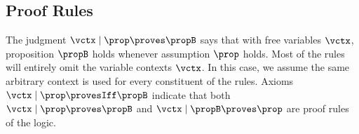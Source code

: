 
\subsection{Proof Rules}
\label{sec:proof-rules}

The judgment $\vctx \mid \prop \proves \propB$ says that with free variables $\vctx$, proposition $\propB$ holds whenever assumption $\prop$ holds.
Most of the rules will entirely omit the variable contexts $\vctx$.
In this case, we assume the same arbitrary context is used for every constituent of the rules.
Axioms $\vctx \mid \prop \provesIff \propB$ indicate that both $\vctx \mid \prop \proves \propB$ and $\vctx \mid \propB \proves \prop$ are proof rules of the logic.


